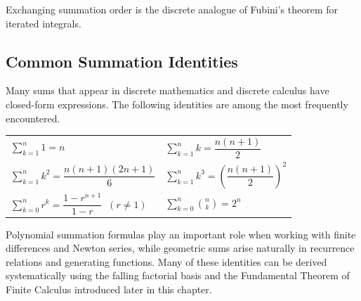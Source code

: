 \begin{remark*}
Exchanging summation order is the discrete analogue of Fubini's theorem
for iterated integrals.
\end{remark*}

\subsection*{Common Summation Identities}
\label{sec:common-summation-identities}

\begin{remark*}
Many sums that appear in discrete mathematics and discrete calculus have
closed-form expressions. The following identities are among the most
frequently encountered.
\end{remark*}

\begin{tcolorbox}[colback=gray!6, colframe=gray!40, arc=2pt,
  left=6pt, right=6pt, top=4pt, bottom=4pt,
  title={\small\textbf{Common Summation Identities}},
  fonttitle=\small\bfseries]
\renewcommand{\arraystretch}{1.7}
\begin{tabular}{@{}ll@{}}
$\displaystyle\sum_{k=1}^{n} 1 = n$ &
$\displaystyle\sum_{k=1}^{n} k = \dfrac{n(n+1)}{2}$ \\[10pt]
$\displaystyle\sum_{k=1}^{n} k^2 = \dfrac{n(n+1)(2n+1)}{6}$ &
$\displaystyle\sum_{k=1}^{n} k^3 = \left(\dfrac{n(n+1)}{2}\right)^2$ \\[10pt]
$\displaystyle\sum_{k=0}^{n} r^k = \dfrac{1-r^{n+1}}{1-r}\;\;(r\neq 1)$ &
$\displaystyle\sum_{k=0}^{n}\binom{n}{k} = 2^n$
\end{tabular}
\end{tcolorbox}

\begin{remark*}
Polynomial summation formulas play an important role when working with
finite differences and Newton series, while geometric sums arise naturally
in recurrence relations and generating functions. Many of these identities
can be derived systematically using the falling factorial basis and
the Fundamental Theorem of Finite Calculus introduced later in this chapter.
\end{remark*}
